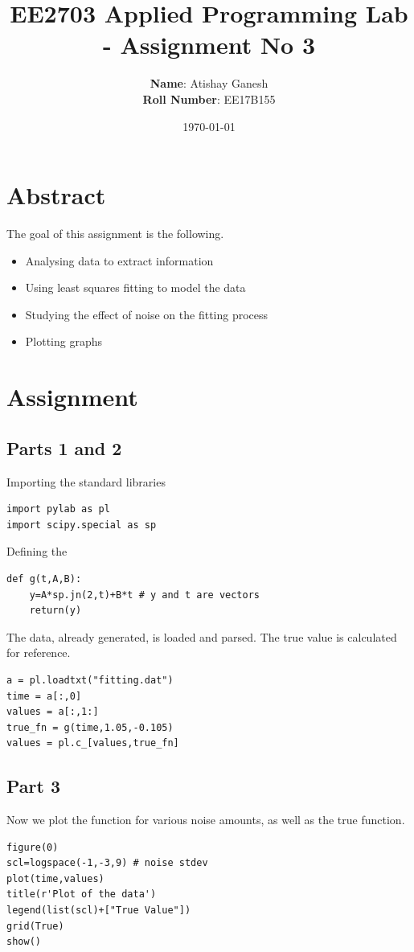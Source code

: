 \documentclass[11pt, a4paper]{article}
\title{EE2703 Applied Programming Lab - Assignment No 3}
\author{
  \textbf{Name}: Atishay Ganesh\\
  \textbf{Roll Number}: EE17B155
}\date{\today}
\begin{document}
		
		
\maketitle 
\section{Abstract}
The goal of this assignment is the following.
\begin{itemize}
\item Analysing data to extract information
\item Using least squares fitting to model the data 
\item Studying the effect of noise on the fitting process
\item Plotting graphs
\end{itemize}

\section{Assignment}
\subsection{Parts 1 and 2}
Importing the standard libraries
\begin{verbatim}
import pylab as pl
import scipy.special as sp
\end{verbatim}
Defining the 
\begin{verbatim}
def g(t,A,B):
	y=A*sp.jn(2,t)+B*t # y and t are vectors
	return(y)
\end{verbatim}
The data, already generated, is loaded and parsed. 
The true value is calculated for reference.
\begin{verbatim}
a = pl.loadtxt("fitting.dat")
time = a[:,0]
values = a[:,1:]
true_fn = g(time,1.05,-0.105)
values = pl.c_[values,true_fn]
\end{verbatim}
\subsection{Part 3}
Now we plot the function for various noise amounts, as well as the true function.
\begin{verbatim}
figure(0)
scl=logspace(-1,-3,9) # noise stdev
plot(time,values)
title(r'Plot of the data')
legend(list(scl)+["True Value"])
grid(True)
show()

\end{verbatim}
\end{document}
